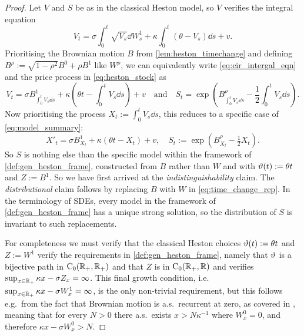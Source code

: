 \begin{proof}
    Let $V$ and $S$ be as in the classical Heston model, so $V$ verifies the integral equation~
    \begin{equation}\label{eq:cir_intergal_eqn}
        V_t = \sigma\int_0^t\sqrt{V_s}\dd W^1_s + \kappa\int_0^t(\theta - V_s)\dd s + v.
    \end{equation}
    Prioritising the Brownian motion $B$ from \autoref{lem:heston_timechange} and defining $B^\rho := \sqrt{1-\rho^2} B^0 + \rho B^1$ like $W^\rho$, we can equivalently write \autoref{eq:cir_intergal_eqn} and the price process in \autoref{eq:heston_stock} as
    \begin{equation}
        V_t = \sigma B^1_{\int_0^t V_s\dd s} + \kappa \left(\theta t - \int_0^t V_s\dd s\right) + v\quad\text{and}\quad  S_t = \exp\left(B^\rho_{\int_0^t V_s\dd s} - \frac12 \int_0^t V_s\dd s\right).
    \end{equation}
    Now prioritising the process $X_t:=\int_0^t V_s\dd s$, this reduces to a specific case of \autoref{eq:model_summary}:
    \begin{equation}\label{eq:time_change_rep}
        X'_t = \sigma B^1_{X_t} + \kappa \left(\theta t - X_t\right) + v,\quad  S_t := \exp\left(B^\rho_{X_t} - \tfrac12 X_t\right).
    \end{equation}
    So $S$ is nothing else than the specific model within the framework of \autoref{def:gen_heston_frame}, constructed from $B$ rather than $W$ and with $\vartheta(t) := \theta t$ and $Z:=B^1$. So we have first arrived at the \emph{indistinguishability} claim. The \emph{distributional} claim follows by replacing $B$ with $W$ in \autoref{eq:time_change_rep}. In the terminology of SDEs, every model in the framework of \autoref{def:gen_heston_frame} has a unique strong solution, so the distribution of $S$ is invariant to such replacements.

    For completeness we must verify that the classical Heston choices $\vartheta(t):=\theta t$ and $Z:=W^1$ verify the requirements in \autoref{def:gen_heston_frame}, namely that $\vartheta$ is a bijective path in $\mathrm{C}_0(\mathbb{R}_+,\mathbb{R}_+)$ and that $Z$ is in $\mathrm{C}_0(\mathbb{R}_+,\mathbb{R})$ and verifies $\sup_{x\in\mathbb{R}_+}\kappa x-\sigma Z_x=\infty$. This final growth condition, i.e.~$\sup_{x\in\mathbb{R}_+}\kappa x-\sigma W^1_x=\infty$, is the only non-trivial requirement, but this follows e.g.~from the fact that Brownian motion is a.s.~recurrent at zero, as covered in \cite{sato_1999}, meaning that for every $N>0$ there a.s.~exists $x>N\kappa^{-1}$ where $W^0_x=0$, and therefore $\kappa x-\sigma W^0_x>N$.
\end{proof}

